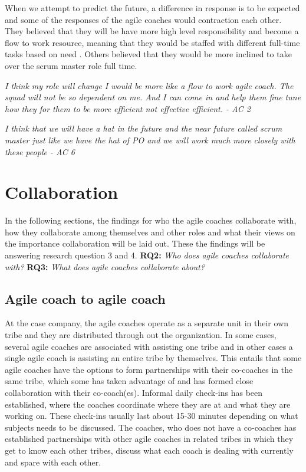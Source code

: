 \documentclass[11pt,a4paper]{report}
\begin{document}
\noindent When we attempt to predict the future, a difference in response is to be expected and some of the responses of the agile coaches would contraction each other. They believed that they will be have more high level responsibility and become a flow to work resource, meaning that they would be staffed with different full-time tasks based on need \cite{flowToWorkDefinition}. Others believed that they would be more inclined to take over the scrum master role full time.

\begin{displayquote}
\textit{
 I think my role will change I would be more like a flow to work agile coach. The squad will not be so dependent on me. And I can come in and help them fine tune how they for them to be more efficient not effective efficient. - AC 2
}
\end{displayquote}

\begin{displayquote}
\textit{
 I think that we will have a hat in the future and the near future called scrum master just like we have the hat of PO and we will work much more closely with these people - AC 6
}
\end{displayquote}

\section{Collaboration}
\label{Collaboration}
In the following sections, the findings for who the agile coaches collaborate with, how they collaborate among themselves and other roles and what their views on the importance collaboration will be laid out. These the findings will be answering research question 3 and 4.
\newline
\newline
\indent \textbf{RQ2:} \emph{Who does agile coaches collaborate with?} \newline
\indent \textbf{RQ3:} \emph{What does agile coaches collaborate about?}
\newline

\subsection{Agile coach to agile coach}
\noindent At the case company, the agile coaches operate as a separate unit in their own tribe and they are distributed through out the organization. In some cases, several agile coaches are associated with assisting one tribe and in other cases a single agile coach is assisting an entire tribe by themselves. This entails that some agile coaches have the options to form partnerships with their co-coaches in the same tribe, which some has taken advantage of and has formed close collaboration with their co-coach(es). Informal daily check-ins has been established, where the coaches coordinate where they are at and what they are working on. These check-ins usually last about 15-30 minutes depending on what subjects needs to be discussed.
The coaches, who does not have a co-coaches has established partnerships with other agile coaches in related tribes in which they get to know each other tribes, discuss what each coach is dealing with currently and spare with each other. 
\end{document}

